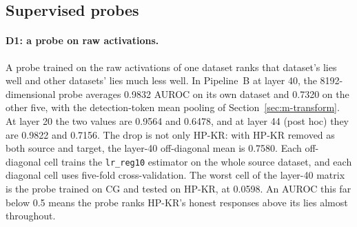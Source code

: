 \subsection{Supervised probes}
\label{sec:r-supervised}

\paragraph{D1: a probe on raw activations.} A probe trained on the raw activations of one dataset ranks that dataset's lies well and other datasets' lies much less well. %
In Pipeline~B at layer 40, the 8192-dimensional probe averages 0.9832 AUROC on its own dataset and 0.7320 on the other five, with the detection-token mean pooling of Section~\ref{sec:m-transform}. %
At layer 20 the two values are 0.9564 and 0.6478, and at layer 44 (post hoc) they are 0.9822 and 0.7156. %
The drop is not only HP-KR: with HP-KR removed as both source and target, the layer-40 off-diagonal mean is 0.7580. %
Each off-diagonal cell trains the \texttt{lr\_reg10} estimator on the whole source dataset, and each diagonal cell uses five-fold cross-validation. %
The worst cell of the layer-40 matrix is the probe trained on CG and tested on HP-KR, at 0.0598. %
An AUROC this far below 0.5 means the probe ranks HP-KR's honest responses above its lies almost throughout. %

